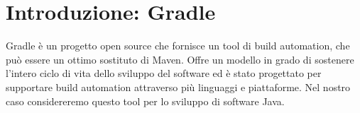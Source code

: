 \section{Introduzione: Gradle} %
Gradle è un progetto open source che fornisce un tool di build automation, che può essere un ottimo sostituto di Maven. Offre un modello in grado di sostenere l'intero ciclo di vita dello sviluppo del software ed è stato progettato per supportare build automation attraverso più linguaggi e piattaforme. Nel nostro caso considereremo questo tool per lo sviluppo di software Java.



